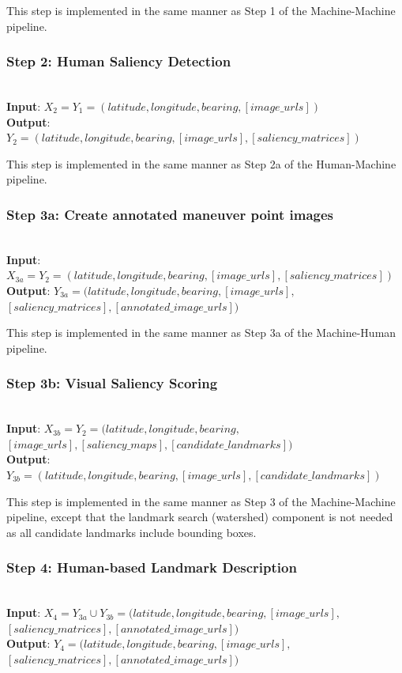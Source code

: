 This step is implemented in the same manner as Step 1 of the Machine-Machine pipeline.

\subsubsection*{Step 2: Human Saliency Detection}~\\
\noindent\textbf{Input}: $X_{2} = Y_1 = (latitude, longitude, bearing, [image\_urls])$\\
\textbf{Output}: $Y_{2} = (latitude, longitude, bearing, [image\_urls], [saliency\_matrices])$ 

This step is implemented in the same manner as Step 2a of the Human-Machine pipeline.

\subsubsection*{Step 3a: Create annotated maneuver point images}~\\
\noindent\textbf{Input}: $X_{3a} = Y_2 = (latitude, longitude, bearing, [image\_urls], [saliency\_matrices])$ \\
\textbf{Output}: $Y_{3a} = (latitude, longitude, bearing, [image\_urls], $\\$[saliency\_matrices], [annotated\_image\_urls])$ 

This step is implemented in the same manner as Step 3a of the Machine-Human pipeline.

\subsubsection*{Step 3b: Visual Saliency Scoring}~\\
\noindent\textbf{Input}: $X_{3b} = Y_2 = (latitude, longitude, bearing, $\\$ [image\_urls], [saliency\_maps], [candidate\_landmarks] )$\\
\textbf{Output}: $Y_{3b} = (latitude, longitude, bearing,  [image\_urls], [candidate\_landmarks] )$ 

This step is implemented in the same manner as Step 3 of the Machine-Machine pipeline, except that the landmark search (watershed) component is not needed as all candidate landmarks include bounding boxes.

\subsubsection*{Step 4: Human-based Landmark Description}~\\
\noindent\textbf{Input}: $X_4 = Y_{3a} \cup Y_{3b} = (latitude, longitude, bearing, [image\_urls],$\\$ [saliency\_matrices], [annotated\_image\_urls])$ \\
\textbf{Output}: $Y_4 = (latitude, longitude, bearing, [image\_urls], $\\$[saliency\_matrices], [annotated\_image\_urls])$ 

